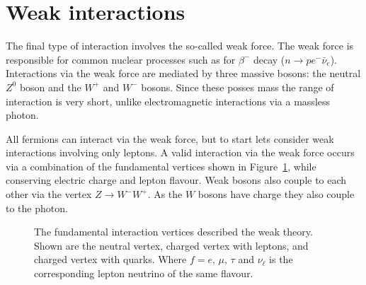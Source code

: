 \section{Weak interactions} \label{sec:TheoryWeakInteractions}

The final type of interaction involves the so-called weak force. The weak force is responsible for common nuclear processes such as for $\beta^{-}$ decay ($n\rightarrow pe^{-}\bar{\nu}_{e}$). Interactions via the weak force are mediated by three massive bosons: the neutral $Z^{0}$ boson and the $W^{+}$ and $W^{-}$ bosons. Since these posses mass the range of interaction is very short, unlike electromagnetic interactions via a massless photon.

All fermions can interact via the weak force, but to start lets consider weak interactions involving only leptons. A valid interaction via the weak force occurs via a combination of the fundamental vertices shown in Figure~\ref{fig:TheoryWeakVertexes}, while conserving electric charge and lepton flavour. Weak bosons also couple to each other via the vertex $Z\rightarrow W^{-}W^{+}$. As the $W$ bosons have charge they also couple to the photon.

\begin{figure}[htbp]
  \centering
    \begin{minipage}[][][t]{.32\textwidth}
      \centering
        
      \label{fig:TheoryWeakNeutralFermions}
    \end{minipage}
    \begin{minipage}[][][t]{.32\textwidth}
      \centering
        
      \label{fig:TheoryWeakChargedLeptons}
    \end{minipage}
    \begin{minipage}[][][t]{.32\textwidth}
      \centering
        
      \label{fig:TheoryWeakChargedQuarks}
    \end{minipage}
    \caption[The fundamental interaction vertices described by the weak theory.]{The fundamental interaction vertices described the weak theory. Shown are the  neutral vertex,  charged vertex with leptons, and  charged vertex with quarks. Where $f=e\textrm{, }\mu\textrm{, }\tau$ and $\nu_{\ell}$ is the corresponding lepton neutrino of the same flavour.}
  \label{fig:TheoryWeakVertexes}
\end{figure}

